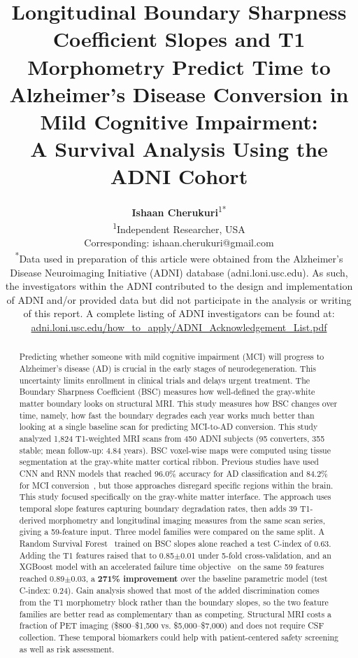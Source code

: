 \documentclass[blue]{ludusofficial}  %
\title{Longitudinal Boundary Sharpness Coefficient Slopes and T1 Morphometry Predict Time to Alzheimer's Disease Conversion in Mild Cognitive Impairment:\\[8pt]A Survival Analysis Using the ADNI Cohort}
\author{%
    \textbf{Ishaan Cherukuri}\textsuperscript{1}\textsuperscript{*}\\[0.2cm]
    \small\textsuperscript{1}Independent Researcher, USA\\
    \small Corresponding: ishaan.cherukuri@gmail.com\\[0.4cm]
    \small\textsuperscript{*}Data used in preparation of this article were obtained from the Alzheimer's Disease Neuroimaging Initiative (ADNI) database (adni.loni.usc.edu). As such, the investigators within the ADNI contributed to the design and implementation of ADNI and/or provided data but did not participate in the analysis or writing of this report. A complete listing of ADNI investigators can be found at: \href{http://adni.loni.usc.edu/wp-content/uploads/how_to_apply/ADNI_Acknowledgement_List.pdf}{adni.loni.usc.edu/how\_to\_apply/ADNI\_Acknowledgement\_List.pdf}
}
\begin{document}
\begin{abstract}
Predicting whether someone with mild cognitive impairment (MCI) will progress to Alzheimer's disease (AD) is crucial in the early stages of neurodegeneration. This uncertainty limits enrollment in clinical trials and delays urgent treatment. The Boundary Sharpness Coefficient (BSC)\cite{olafson2021bsc} measures how well-defined the gray-white matter boundary looks on structural MRI. This study measures how BSC changes over time, namely, how fast the boundary degrades each year works much better than looking at a single baseline scan for predicting MCI-to-AD conversion. This study analyzed 1,824 T1-weighted MRI scans from 450 ADNI subjects (95 converters, 355 stable; mean follow-up: 4.84 years). BSC voxel-wise maps were computed using tissue segmentation at the gray-white matter cortical ribbon. Previous studies have used CNN and RNN models that reached 96.0\% accuracy for AD classification and 84.2\% for MCI conversion~\cite{hafeez2024deep}, but those approaches disregard specific regions within the brain. This study focused specifically on the gray-white matter interface. The approach uses temporal slope features capturing boundary degradation rates, then adds 39 T1-derived morphometry and longitudinal imaging measures from the same scan series, giving a 59-feature input. Three model families were compared on the same split. A Random Survival Forest~\cite{ishwaran2008rsf} trained on BSC slopes alone reached a test C-index of 0.63. Adding the T1 features raised that to 0.85$\pm$0.01 under 5-fold cross-validation, and an XGBoost model with an accelerated failure time objective~\cite{chen2016xgboost} on the same 59 features reached 0.89$\pm$0.03, a \textbf{271\% improvement} over the baseline parametric model (test C-index: 0.24). Gain analysis showed that most of the added discrimination comes from the T1 morphometry block rather than the boundary slopes, so the two feature families are better read as complementary than as competing. Structural MRI costs a fraction of PET imaging (\$800--\$1,500 vs. \$5,000--\$7,000) and does not require CSF collection. These temporal biomarkers could help with patient-centered safety screening as well as risk assessment.
\end{abstract}
\end{document}
